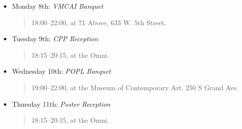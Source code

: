 
\label{Socials}

\begin{itemize}
\item Monday 8th: \textit{VMCAI Banquet}
      \begin{quote}
        18:00--22:00, at 71 Above, 633 W. 5th Street.%
      \end{quote}
\item Tuesday 9th: \textit{CPP Reception}
      \begin{quote}
        18:15--20:15, at the Omni.
      \end{quote}
\item Wednesday 10th: \textit{POPL Banquet}
      \begin{quote}
        19:00--22:00, at the Museum of Contemporary Art, 250 S Grand Ave.%
      \end{quote}
\item Thursday 11th: \textit{Poster Reception}
      \begin{quote}
        18:15--20:15, at the Omni.
      \end{quote}
\end{itemize}





\newpage
